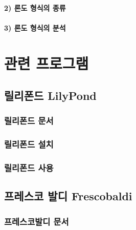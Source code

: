 \documentclass[12pt, a4paper, oneside]{book}
\let\stdsection\section
\renewcommand\section{\newpage\stdsection}
\begin{document}
	\subsection{2) 론도 형식의 종류}

	\subsection{3) 론도 형식의 분석}




	\part{관련 프로그램}
	\noptcrule
	\parttoc				



	\chapter{릴리폰드 LilyPond}
	\noptcrule
	\parttoc				

	\section{릴리폰드 문서}

	\section{릴리폰드 설치}


	\section{릴리폰드 사용}




	\chapter{프레스코 발디  Frescobaldi}
	\noptcrule
	\parttoc				

	\section{프레스코발디 문서}
\end{document}
